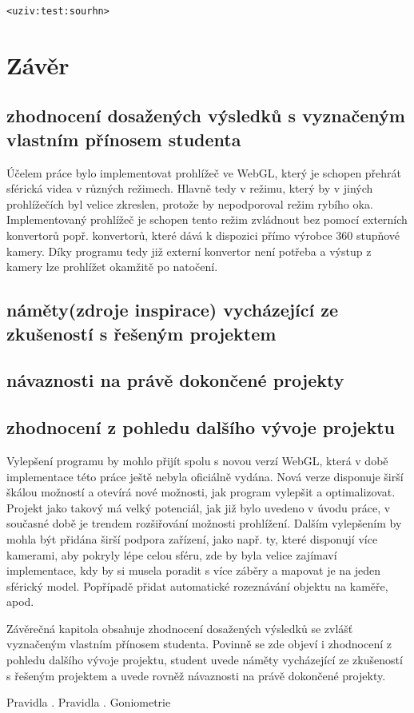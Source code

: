 \texttt{<uziv:test:sourhn>}
 


\chapter{Závěr}
\label{chapter:6}

\section{zhodnocení  dosažených výsledků s  vyznačeným vlastním přínosem studenta}
Účelem práce bylo implementovat prohlížeč ve WebGL, který je schopen přehrát sférická videa v různých režimech. Hlavně tedy v režimu, který by v jiných prohlížečích byl velice zkreslen, protože by nepodporoval režim rybího oka. Implementovaný prohlížeč je schopen tento režim zvládnout bez pomocí externích konvertorů popř. konvertorů, které dává k dispozici přímo výrobce 360 stupňové kamery. Díky programu tedy již externí konvertor není potřeba a výstup z kamery lze prohlížet okamžitě po natočení.


\section{náměty(zdroje inspirace) vycházející ze zkušeností s řešeným projektem}
\section{návaznosti na právě dokončené projekty}


\section{zhodnocení z pohledu dalšího vývoje projektu}
Vylepšení programu by mohlo přijít spolu s novou verzí WebGL, která v době implementace této práce ještě nebyla oficiálně vydána. Nová verze disponuje širší škálou možností a otevírá nové možnosti, jak program vylepšit a optimalizovat. Projekt jako takový má velký potenciál, jak již bylo uvedeno v úvodu práce, v současné době je trendem  rozšiřování možnosti prohlížení. Dalším vylepšením by mohla být přidána širší podpora zařízení, jako např. ty, které disponují více kamerami, aby pokryly lépe celou sféru, zde by byla velice zajímaví implementace, kdy  by si musela poradit s více záběry a mapovat je na jeden sférický model. Popřípadě přidat automatické rozeznávání objektu na kaměře, apod.

\newpage

Závěrečná kapitola obsahuje zhodnocení dosažených výsledků se zvlášť vyznačeným vlastním přínosem studenta. Povinně se zde objeví i zhodnocení z pohledu dalšího vývoje projektu, student uvede náměty vycházející ze zkušeností s řešeným projektem a uvede rovněž návaznosti na právě dokončené projekty.


Pravidla \cite{Kompendium}. Pravidla \cite{Goniometrie}. 
Goniometrie


